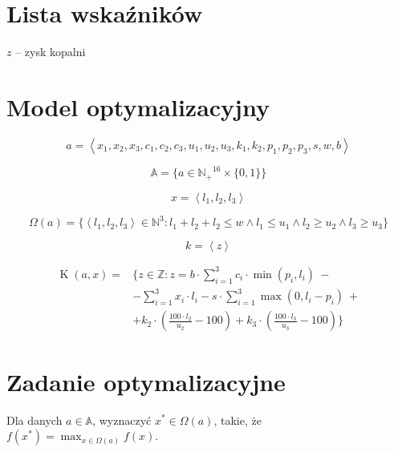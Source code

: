 \documentclass[titlepage]{article}
\begin{document}
\section{Lista wskaźników}
$z$ -- zysk kopalni

\section{Model optymalizacyjny}
\begin{equation}
	a = \left< x_1, x_2, x_3, c_1, c_2, c_3, u_1, u_2, u_3, k_1, k_2, p_1, p_2, p_3, s, w, b \right>
\end{equation}

\begin{equation}
	\mathbb{A} = \{ a \in \mathbb{N_+}^{16} \times \{ 0, 1 \} \}
\end{equation}

\begin{equation}
	x = \left< l_1, l_2, l_3 \right>
\end{equation}

\begin{equation}
	\Omega(a) = \{ \left< l_1, l_2, l_3 \right> \in \mathbb{N}^3 : l_1 + l_2 + l_2 \leq w \land l_1 \leq u_1 \land l_2 \geq u_2 \land l_3 \geq u_3 \}
\end{equation}

\begin{equation}
	k = \left< z \right>
\end{equation}

\begin{equation}
	\begin{aligned}
		\operatorname{K}(a, x) ={} & \{ z \in \mathbb{Z} : z = b \cdot \sum_{i = 1}^3 c_i \cdot \min{(p_i, l_i)} \ -                \\
		                           & - \sum_{i = 1}^3 x_i \cdot l_i - s \cdot \sum_{i = 1}^3 \max{(0, l_i - p_i)} \ +               \\
		                           & + k_2 \cdot (\frac{100 \cdot l_2}{u_2} - 100) + k_3 \cdot (\frac{100 \cdot l_3}{u_3} - 100) \} 
	\end{aligned}
\end{equation}

\section{Zadanie optymalizacyjne}
Dla danych $a \in \mathbb{A}$, wyznaczyć $x^* \in \Omega(a)$, takie, że $f(x^*) = \max_{x \in \Omega(a)}{f(x)}$.
\end{document}
